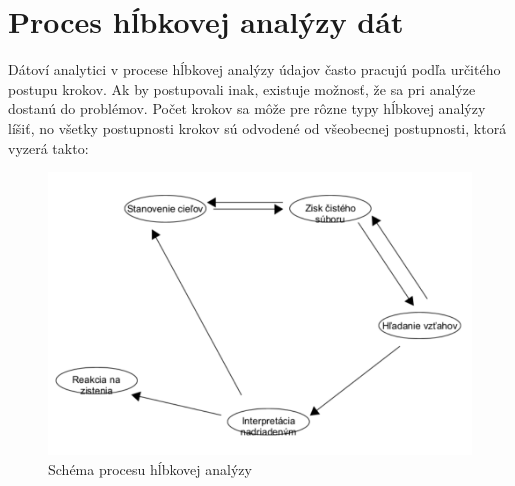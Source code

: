 \documentclass[10pt,twoside,slovak,a4paper]{article}
\begin{document}
\section{Proces hĺbkovej analýzy dát} 
Dátoví analytici v procese hĺbkovej analýzy údajov často pracujú podľa určitého postupu krokov. Ak by postupovali inak, existuje možnosť, že sa pri analýze dostanú do problémov. Počet krokov sa môže pre rôzne typy hĺbkovej analýzy líšiť, no všetky postupnosti krokov sú odvodené od všeobecnej postupnosti, ktorá vyzerá takto:\\
\begin{figure}
    \includegraphics[width=1\linewidth]{diagram datamining.pdf}
    \caption{Schéma procesu hĺbkovej analýzy\cite{Rutgers}}
\end{figure}
\end{document}
